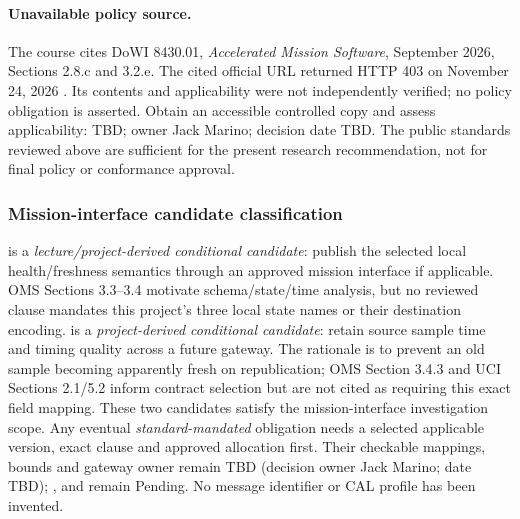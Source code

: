 \paragraph{Unavailable policy source.}
The course cites DoWI 8430.01, \emph{Accelerated Mission Software}, September
2026, Sections 2.8.c and 3.2.e. The cited official URL returned HTTP 403 on
November 24, 2026 \cite{DoWI843001}. Its contents and applicability were not
independently verified; no policy obligation is asserted. Obtain an accessible
controlled copy and assess applicability: TBD; owner Jack Marino; decision
date TBD. The public standards reviewed above are sufficient for the present
research recommendation, not for final policy or conformance approval.

\subsubsection{Mission-interface candidate classification}
 is a \emph{lecture/project-derived conditional
candidate}: publish the selected local health/freshness semantics through an
approved mission interface if applicable. OMS Sections 3.3--3.4 motivate
schema/state/time analysis, but no reviewed clause mandates this project's
three local state names or their destination encoding.
 is a \emph{project-derived conditional candidate}:
retain source sample time and timing quality across a future gateway.
The rationale is to prevent an old sample becoming apparently fresh on
republication; OMS Section 3.4.3 and UCI Sections 2.1/5.2 inform contract
selection but are not cited as requiring this exact field mapping.
These two candidates satisfy the mission-interface investigation scope.
Any eventual \emph{standard-mandated} obligation needs a selected applicable
version, exact clause and approved allocation first. Their checkable mappings,
bounds and gateway owner remain TBD (decision owner Jack Marino; date TBD);
,  and 
remain Pending. No message identifier or CAL profile has been invented.

